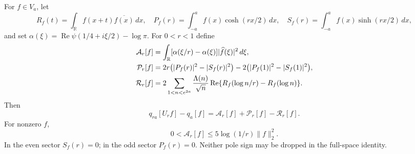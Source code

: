 \begin{proposition}
\label{prop:ns55fc-dilation}
For $f\in V_a$, let
\[
 R_f(t)=\int_{\mathbb R}f(x+t)\overline{f(x)}\,dx,
 \quad P_f(r)=\int_{-a}^a f(x)\cosh(rx/2)\,dx,
 \quad S_f(r)=\int_{-a}^a f(x)\sinh(rx/2)\,dx,
\]
and set $\alpha(\xi)=\operatorname{Re}\psi(1/4+i\xi/2)-\log\pi$.
For $0<r<1$ define
\begin{align}
 \mathcal A_r[f]&=\int_{\mathbb R}
    [\alpha(\xi/r)-\alpha(\xi)]|\widehat f(\xi)|^2\,d\xi,
       \label{eq:ns55fc-arch}\\
 \mathcal P_r[f]&=2r\bigl(|P_f(r)|^2-|S_f(r)|^2\bigr)
                  -2\bigl(|P_f(1)|^2-|S_f(1)|^2\bigr),\notag\\
 \mathcal R_r[f]&=2\sum_{1<n<e^{2a}}\frac{\Lambda(n)}{\sqrt n}
          \operatorname{Re}\{R_f(\log n/r)-R_f(\log n)\}.
          \notag
\end{align}
Then
\begin{equation}\label{eq:ns55fc-defect}
 q_{ra}[U_rf]-q_a[f]
       =\mathcal A_r[f]+\mathcal P_r[f]-\mathcal R_r[f].
\end{equation}
For nonzero $f$,
\begin{equation}\label{eq:ns55fc-arch-bound}
 0<\mathcal A_r[f]\le5\log(1/r)\|f\|_2^2.
\end{equation}
In the even sector $S_f(r)=0$; in the odd sector $P_f(r)=0$.
Neither pole sign may be dropped in the full-space identity.
\end{proposition}
